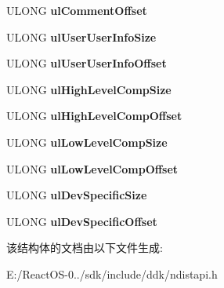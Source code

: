 \begin{DoxyCompactItemize}
U\+L\+O\+NG {\bfseries ul\+Comment\+Offset}
\item 
\mbox{\label{struct___l_i_n_e___c_a_l_l___p_a_r_a_m_s_ab780dce933a6253313333b53d34a11ee}} 
U\+L\+O\+NG {\bfseries ul\+User\+User\+Info\+Size}
\item 
\mbox{\label{struct___l_i_n_e___c_a_l_l___p_a_r_a_m_s_a7bfeda8212fd50c1a00a7ac9cdf66585}} 
U\+L\+O\+NG {\bfseries ul\+User\+User\+Info\+Offset}
\item 
\mbox{\label{struct___l_i_n_e___c_a_l_l___p_a_r_a_m_s_a61b906068f6f60c589542c1fbff8a21b}} 
U\+L\+O\+NG {\bfseries ul\+High\+Level\+Comp\+Size}
\item 
\mbox{\label{struct___l_i_n_e___c_a_l_l___p_a_r_a_m_s_a15a5d0c8fdb77078bb1403cb6ed811a1}} 
U\+L\+O\+NG {\bfseries ul\+High\+Level\+Comp\+Offset}
\item 
\mbox{\label{struct___l_i_n_e___c_a_l_l___p_a_r_a_m_s_ae3465da7d5e80b8d672d2ded7934732b}} 
U\+L\+O\+NG {\bfseries ul\+Low\+Level\+Comp\+Size}
\item 
\mbox{\label{struct___l_i_n_e___c_a_l_l___p_a_r_a_m_s_a86130e792afb2b9ef14ff1f7b1dc74b6}} 
U\+L\+O\+NG {\bfseries ul\+Low\+Level\+Comp\+Offset}
\item 
\mbox{\label{struct___l_i_n_e___c_a_l_l___p_a_r_a_m_s_a148266f407d73f0414f2e9daa2de8154}} 
U\+L\+O\+NG {\bfseries ul\+Dev\+Specific\+Size}
\item 
\mbox{\label{struct___l_i_n_e___c_a_l_l___p_a_r_a_m_s_a6e5a10baac56191a721439b3fadcf923}} 
U\+L\+O\+NG {\bfseries ul\+Dev\+Specific\+Offset}
\end{DoxyCompactItemize}


该结构体的文档由以下文件生成\+:\begin{DoxyCompactItemize}
\item 
E\+:/\+React\+O\+S-\/0../sdk/include/ddk/ndistapi.\+h\end{DoxyCompactItemize}
